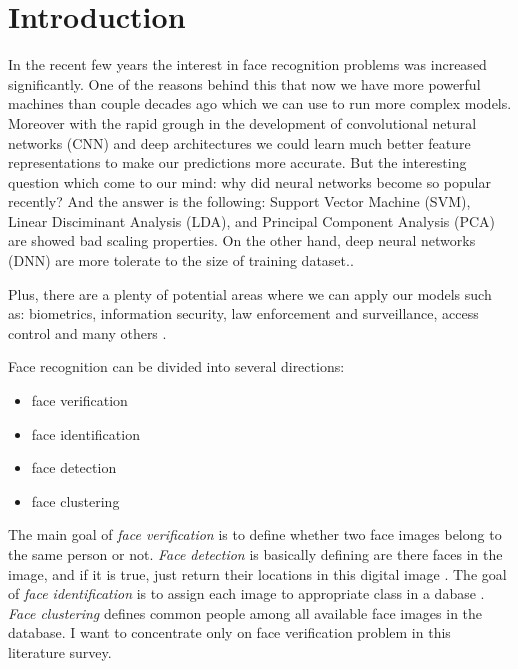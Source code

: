 \documentclass[paper=a4, fontsize=11pt]{scrartcl} %
\numberwithin{equation}{section} %
\numberwithin{figure}{section} %
\numberwithin{table}{section} %
\begin{document}

\newpage

\section{Introduction}

In the recent few years the interest in face recognition problems was increased significantly. One of the reasons behind this that now we have more powerful machines than couple decades ago which we can use to run more complex models. Moreover with the rapid grough in the development of convolutional netural networks (CNN) and deep architectures we could learn much better feature representations to make our predictions more accurate. But the interesting question which come to our mind: why did neural networks become so popular recently? And the answer is the following: Support Vector Machine (SVM), Linear Disciminant Analysis (LDA), and Principal Component Analysis (PCA) are showed bad scaling properties. On the other hand, deep neural networks (DNN) are more tolerate to the size of training dataset.\cite{taigman2014deepface}.


Plus, there are a plenty of potential areas where we can apply our models such as: biometrics, information security, law enforcement and surveillance, access control and many others \cite{zhao2003face}. \par
Face recognition can be divided into several directions:
\begin{itemize}
  \item face verification
  \item face identification
  \item face detection
  \item face clustering
\end{itemize}

The main goal of \textit{face verification} is to define whether two face images belong to the same person or not. \textit{Face detection} is basically defining are there faces in the image, and if it is true, just return their locations in this digital image \cite{yang2002detecting}. The goal of \textit{face identification} is to assign each image to appropriate class in a dabase \cite{seo2011face}. \textit{Face clustering} defines common people among all available face images in the database. I want to concentrate only on face verification problem in this literature survey. \par
\end{document}

